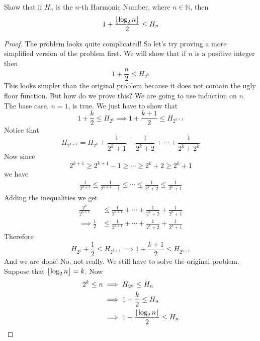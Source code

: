 \documentclass[11pt,numbers=noenddot,svgnames,dvipsnames]{scrartcl}
\begin{document}
\begin{example}
    Show that if $H_{n}$ is the $n$-th Harmonic Number, where $n \in \mathbb{N}$, then 
    \[
        1 + \frac{\left\lfloor \log_{2} n \right\rfloor}{2} \leq H_{n}
    \]
\end{example}
\begin{proof}
    The problem looks quite complicated! So let's try proving a more simplified version of the problem first. 
    We will show that if $n$ is a positive integer then
    \[
        1 + \frac{n}{2} \leq H_{2^{n}}
    \]
    This looks simpler than the original problem because it does not contain the ugly floor function. 
    But how do we prove this? We are going to use induction on $n$. \\
    The base case, $n = 1$, is true. We just have to show that 
    \[
        1 + \frac{k}{2} \leq H_{2^{k}} \implies 1 + \frac{k + 1}{2} \leq H_{2^{k + 1}}
    \]
    Notice that 
    \[
        H_{2^{k + 1}} = H_{2^{k}} + \frac{1}{2^{k} + 1} + \frac{1}{2^{k} + 2} + \cdots + \frac{1}{2^{k} + 2^{k}}
    \]
    Now since 
    \[
        2^{k + 1} \geq 2^{k + 1} - 1 \geq \cdots \geq 2^{k} + 2 \geq 2^{k} + 1
    \]
    we have 
    \begin{align*}
        \frac{1}{2^{k + 1}} \leq \frac{1}{2^{k + 1} - 1} \leq \cdots \leq \frac{1}{2^{k} + 2} \leq \frac{1}{2^{k} + 1}
    \end{align*}
    Adding the inequalities we get 
    \begin{align*}
        \frac{2^{k}}{2^{k + 1}} &\leq \frac{1}{2^{k + 1}} + \cdots + \frac{1}{2^{k} + 2} + \frac{1}{2^{k} + 1} \\
        \implies \frac{1}{2} &\leq \frac{1}{2^{k + 1}} + \cdots + \frac{1}{2^{k} + 2} + \frac{1}{2^{k} + 1}
    \end{align*}
    Therefore 
    \[
        H_{2^{k}} + \frac{1}{2} \leq H_{2^{k+1}} \implies 1 + \frac{k + 1}{2} \leq H_{2^{k + 1}}
    \]
    And we are done! No, not really. We still have to solve the original problem. \\
    Suppose that $\left\lfloor \log_{2} n \right\rfloor = k$. Now
    \begin{align*}
        2^{k} \leq n & \implies H_{2^{k}} \leq H_{n} \\
                     & \implies 1 + \frac{k}{2} \leq H_{n} \\
                     & \implies 1 + \frac{\left\lfloor \log_{2} n \right\rfloor}{2} \leq H_{n}
    \end{align*}
\end{proof}
\end{document}
